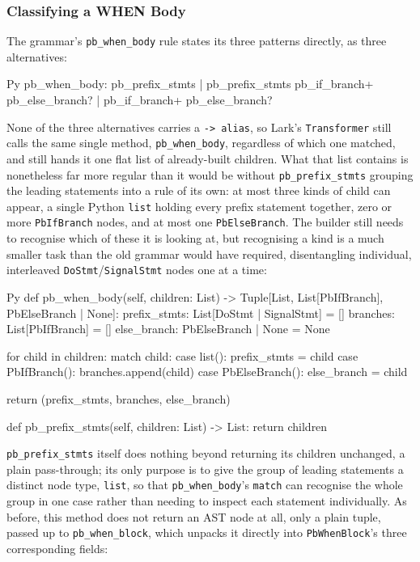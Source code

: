 \subsubsection{Classifying a WHEN Body}
The grammar's \lstinline|pb_when_body| rule states its three patterns directly, as three alternatives:
\begin{codeblock}[]{Py}
pb_when_body: pb_prefix_stmts
            | pb_prefix_stmts pb_if_branch+ pb_else_branch?
            | pb_if_branch+ pb_else_branch?
\end{codeblock}
None of the three alternatives carries a \lstinline|-> alias|, so Lark's \lstinline|Transformer| still calls the same single method, \lstinline|pb_when_body|, regardless of which one matched, and still hands it one flat list of already-built children. What that list contains is nonetheless far more regular than it would be without \lstinline|pb_prefix_stmts| grouping the leading statements into a rule of its own: at most three kinds of child can appear, a single Python \lstinline|list| holding every prefix statement together, zero or more \lstinline|PbIfBranch| nodes, and at most one \lstinline|PbElseBranch|. The builder still needs to recognise which of these it is looking at, but recognising a kind is a much smaller task than the old grammar would have required, disentangling individual, interleaved \lstinline|DoStmt|/\lstinline|SignalStmt| nodes one at a time:
\begin{codeblock}[]{Py}
def pb_when_body(self, children: List) -> Tuple[List, List[PbIfBranch], PbElseBranch | None]:
    prefix_stmts: List[DoStmt | SignalStmt] = []
    branches: List[PbIfBranch] = []
    else_branch: PbElseBranch | None = None

    for child in children:
        match child:
            case list():
                prefix_stmts = child
            case PbIfBranch():
                branches.append(child)
            case PbElseBranch():
                else_branch = child

    return (prefix_stmts, branches, else_branch)

def pb_prefix_stmts(self, children: List) -> List:
    return children
\end{codeblock}
\lstinline|pb_prefix_stmts| itself does nothing beyond returning its children unchanged, a plain pass-through; its only purpose is to give the group of leading statements a distinct node type, \lstinline|list|, so that \lstinline|pb_when_body|'s \lstinline|match| can recognise the whole group in one case rather than needing to inspect each statement individually. As before, this method does not return an AST node at all, only a plain tuple, passed up to \lstinline|pb_when_block|, which unpacks it directly into \lstinline|PbWhenBlock|'s three corresponding fields:
